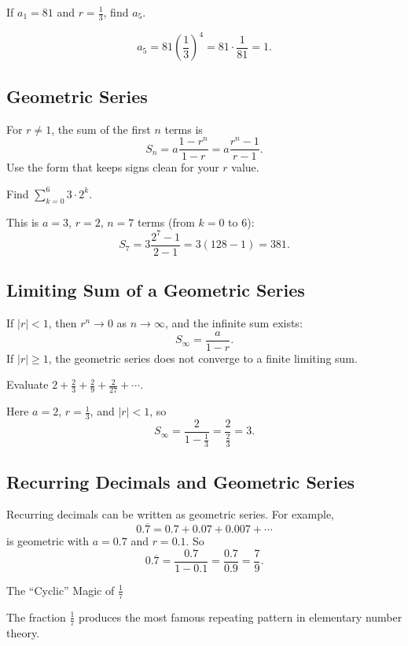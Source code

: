\begin{problem}[Recognizing a GP]
If $a_1=81$ and $r=\frac13$, find $a_5$.
\end{problem}
\begin{solution}
\[
a_5 = 81\left(\frac13\right)^4 = 81\cdot\frac{1}{81}=1.
\]
\end{solution}

\subsection{Geometric Series}
For $r\ne 1$, the sum of the first $n$ terms is
\[
S_n = a\frac{1-r^n}{1-r} = a\frac{r^n-1}{r-1}.
\]
Use the form that keeps signs clean for your $r$ value.

\begin{problem}
Find $\sum_{k=0}^{6}3\cdot 2^k$.
\end{problem}
\begin{solution}
This is $a=3$, $r=2$, $n=7$ terms (from $k=0$ to $6$):
\[
S_7 = 3\frac{2^7-1}{2-1}=3(128-1)=381.
\]
\end{solution}

\subsection{Limiting Sum of a Geometric Series}
If $|r|<1$, then $r^n\to 0$ as $n\to\infty$, and the infinite sum exists:
\[
S_\infty = \frac{a}{1-r}.
\]
If $|r|\ge 1$, the geometric series does not converge to a finite limiting sum.

\begin{problem}[Infinite GP]
Evaluate $2+\frac{2}{3}+\frac{2}{9}+\frac{2}{27}+\cdots$.
\end{problem}
\begin{solution}
Here $a=2$, $r=\frac13$, and $|r|<1$, so
\[
S_\infty=\frac{2}{1-\frac13}=\frac{2}{\frac23}=3.
\]
\end{solution}

\subsection{Recurring Decimals and Geometric Series}
Recurring decimals can be written as geometric series.
For example,
\[
0.\overline{7}=0.7+0.07+0.007+\cdots
\]
is geometric with $a=0.7$ and $r=0.1$. So
\[
0.\overline{7}=\frac{0.7}{1-0.1}=\frac{0.7}{0.9}=\frac79.
\]

The ``Cyclic'' Magic of $\frac{1}{7}$

The fraction $\frac{1}{7}$ produces the most famous repeating pattern in elementary number theory.

